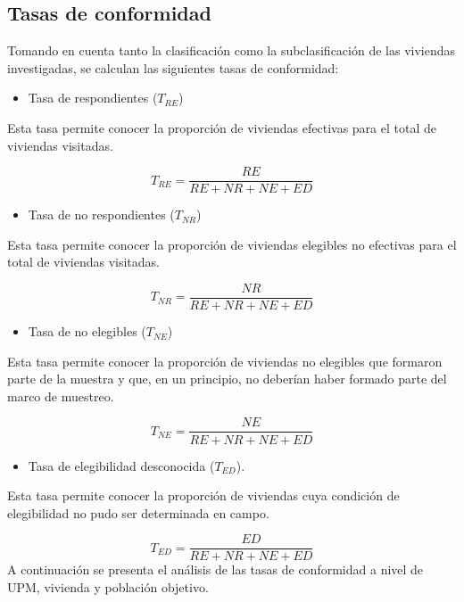 \documentclass[
]{article}
\providecommand{\tightlist}{%
  \setlength{\itemsep}{0pt}\setlength{\parskip}{0pt}}
\begin{document}
\hypertarget{tasas-de-conformidad}{%
\subsection{Tasas de conformidad}\label{tasas-de-conformidad}}

Tomando en cuenta tanto la clasificación como la subclasificación de las
viviendas investigadas, se calculan las siguientes tasas de conformidad:

\begin{itemize}
\tightlist
\item
  Tasa de respondientes (\(T_{RE}\))
\end{itemize}

Esta tasa permite conocer la proporción de viviendas efectivas para el
total de viviendas visitadas.

\[T_{RE} = \frac{RE}{RE + NR + NE + ED}\]

\begin{itemize}
\tightlist
\item
  Tasa de no respondientes (\(T_{NR}\))
\end{itemize}

Esta tasa permite conocer la proporción de viviendas elegibles no
efectivas para el total de viviendas visitadas.

\[T_{NR} = \frac{NR}{RE + NR + NE + ED}\]

\begin{itemize}
\tightlist
\item
  Tasa de no elegibles (\(T_{NE}\))
\end{itemize}

Esta tasa permite conocer la proporción de viviendas no elegibles que
formaron parte de la muestra y que, en un principio, no deberían haber
formado parte del marco de muestreo.

\[T_{NE} = \frac{NE}{RE + NR + NE + ED}\]

\begin{itemize}
\tightlist
\item
  Tasa de elegibilidad desconocida (\(T_{ED}\)).
\end{itemize}

Esta tasa permite conocer la proporción de viviendas cuya condición de
elegibilidad no pudo ser determinada en campo.

\[T_{ED} = \frac{ED}{RE + NR + NE + ED}\] A continuación se presenta el
análisis de las tasas de conformidad a nivel de UPM, vivienda y
población objetivo. \newpage
\end{document}
